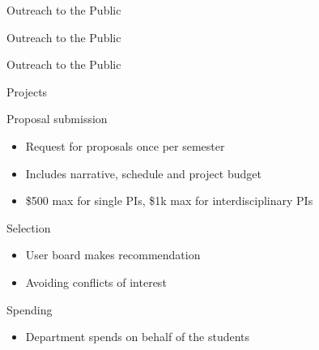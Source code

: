 \documentclass[xcolor=table,compress,professionalfonts,pdfpagelabels]{beamer}
\begin{document}
\begin{frame}{Outreach to the Public}
\end{frame}

\begin{frame}{Outreach to the Public}
\end{frame}

\begin{frame}{Outreach to the Public}
\end{frame}

\begin{frame}{Projects}
 \begin{block}{Proposal submission}
  \begin{itemize}
   \item Request for proposals once per semester
   \item Includes narrative, schedule and project budget
   \item \$500 max for single PIs, \$1k max for interdisciplinary PIs
  \end{itemize}
 \end{block}
 \begin{block}{Selection}
  \begin{itemize}
   \item User board makes recommendation
   \item Avoiding conflicts of interest
  \end{itemize}
 \end{block}
 \begin{block}{Spending}
  \begin{itemize}
   \item Department spends on behalf of the students
  \end{itemize}
 \end{block}
\end{frame}
\end{document}
